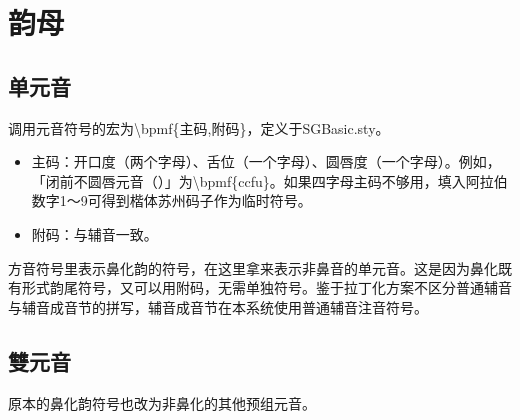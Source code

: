 \section{韵母}
\subsection{单元音}
调用元音符号的宏为{\textbackslash}bpmf\{主码,附码\}，定义于SGBasic.sty。\par
\begin{itemize}
	\item 主码：开口度（两个字母）、舌位（一个字母）、圆唇度（一个字母）。例如，「闭前不圆唇元音（）」为{\textbackslash}bpmf\{ccfu\}。如果四字母主码不够用，填入阿拉伯数字1～9可得到楷体苏州码子作为临时符号。
	\item 附码：与辅音一致。
\end{itemize}
方音符号里表示鼻化韵的符号，在这里拿来表示非鼻音的单元音。这是因为鼻化既有形式韵尾符号，又可以用附码，无需单独符号。鉴于拉丁化方案不区分普通辅音与辅音成音节的拼写，辅音成音节在本系统使用普通辅音注音符号。


\subsection{雙元音}
原本的鼻化韵符号也改为非鼻化的其他预组元音。\par
{}%

\clearpage